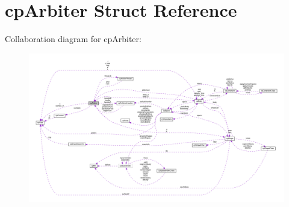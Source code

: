 \hypertarget{structcpArbiter}{}\section{cp\+Arbiter Struct Reference}
\label{structcpArbiter}


Collaboration diagram for cp\+Arbiter\+:
\nopagebreak
\begin{figure}[H]
\begin{center}
\leavevmode
\includegraphics[width=350pt]{structcpArbiter__coll__graph}
\end{center}
\end{figure}
